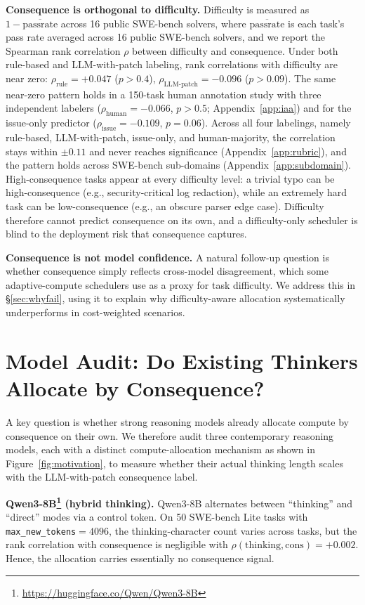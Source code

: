 \documentclass{article}
\begin{document}
\textbf{Consequence is orthogonal to difficulty.} Difficulty is measured as $1-\overline{\mathrm{passrate}}$ across 16 public SWE-bench solvers, where
$\overline{\mathrm{passrate}}$ is each task's pass rate averaged across
16 public SWE-bench solvers, and we report the Spearman rank correlation
$\rho$ between difficulty and consequence. Under both rule-based and LLM-with-patch labeling, rank correlations with difficulty are near zero: $\rho_{\mathrm{rule}}{=}{+}0.047$ ($p>0.4$), $\rho_{\mathrm{LLM\text{-}patch}}{=}{-}0.096$ ($p>0.09$). The same near-zero pattern holds in a 150-task human annotation study with three independent labelers ($\rho_{\mathrm{human}}{=}{-}0.066$,
$p>0.5$; Appendix~\ref{app:iaa}) and for the issue-only predictor
($\rho_{\mathrm{issue}}{=}{-}0.109$, $p=0.06$). Across all four labelings, namely
rule-based, LLM-with-patch, issue-only, and human-majority, the correlation stays within $\pm 0.11$ and never reaches significance
(Appendix~\ref{app:rubric}), and the pattern holds across SWE-bench sub-domains (Appendix~\ref{app:subdomain}). High-consequence tasks appear at every difficulty level: a trivial typo can be high-consequence (e.g., security-critical log redaction), while an extremely hard task can be low-consequence (e.g., an obscure parser edge case). Difficulty therefore cannot predict consequence on its own, and a difficulty-only scheduler is blind to the deployment risk that consequence captures.

\textbf{Consequence is not model confidence.} A natural follow-up question is whether consequence simply reflects cross-model disagreement, which some adaptive-compute schedulers use as a proxy for task difficulty. We address this in \S\ref{sec:whyfail}, using it to explain why difficulty-aware allocation systematically underperforms in cost-weighted scenarios.

\section{Model Audit: Do Existing Thinkers Allocate by Consequence?}
\label{sec:audit}

A key question is whether strong reasoning models already allocate
compute by consequence on their own. We therefore audit three contemporary reasoning models, each with a distinct compute-allocation mechanism as shown in Figure~\ref{fig:motivation}, to measure whether their actual thinking length scales with
the LLM-with-patch consequence label.

\textbf{Qwen3-8B\footnote{\url{https://huggingface.co/Qwen/Qwen3-8B}}  (hybrid thinking).} Qwen3-8B alternates
between ``thinking'' and ``direct'' modes via a control token. On 50
SWE-bench Lite tasks with \texttt{max\_new\_tokens}$=4096$, the thinking-character
count varies across tasks, but the rank correlation with consequence
is negligible with $\rho(\mathrm{thinking}, \mathrm{cons}) = +0.002$. Hence, the allocation carries essentially no consequence signal.
\end{document}
